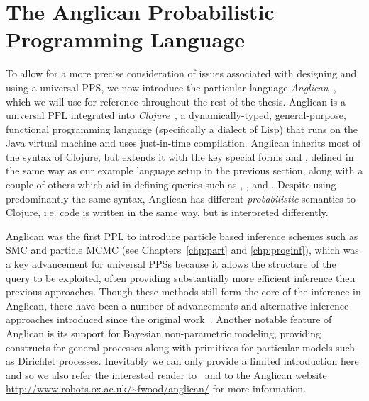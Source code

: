 
\section{The Anglican Probabilistic Programming Language}
\label{sec:probprog:anglican}

To allow for a more precise consideration of issues associated with designing and using a universal
PPS, we now introduce the particular language \emph{Anglican}~\citep{wood2014new,tolpin2016design},
which we will use for reference throughout the rest of the thesis.  
Anglican is a universal PPL integrated into \emph{Clojure}~\citep{hickey2008clojure}, a dynamically-typed, general-purpose, functional
programming language (specifically a dialect of Lisp) that runs on the Java virtual machine and uses just-in-time compilation.
Anglican inherits most of the syntax of Clojure, but extends it with the key
special forms \sample and \observe \citep{tolpin2015probabilistic,tolpin2016design}, defined in the same way as
our example language setup in the previous section, along with a couple of others which aid in defining queries
such as \mem, \store, and \retrieve.  Despite using predominantly the same syntax, Anglican has different
\emph{probabilistic} semantics to Clojure, i.e. code is written in the same way, but is interpreted differently.

Anglican was the first PPL to introduce particle based 
inference schemes such as SMC and particle MCMC (see Chapters~\ref{chp:part} and \ref{chp:proginf}), which was a
key advancement for universal PPSs because it allows the structure of the query to be exploited, often providing
substantially more efficient inference then previous approaches.  Though these methods still form the core
of the inference in Anglican, there have been a number of advancements and alternative inference approaches introduced since
the original work~\citep{paige2014asynchronous,tolpin-socs-2015,tolpin2015output,vandemeent_aistats_2015,
	rainforth2016bayesian,rainforth2016interacting,le2017inference}.  Another notable feature of Anglican is its
support for Bayesian non-parametric modeling, providing constructs for general processes along with
primitives for particular models such as Dirichlet processes.  Inevitably we can only provide a limited 
introduction here and so we also refer the interested reader to~\cite{tolpin2016design} and to the Anglican website {\small\url{http://www.robots.ox.ac.uk/~fwood/anglican/}} for more information.

